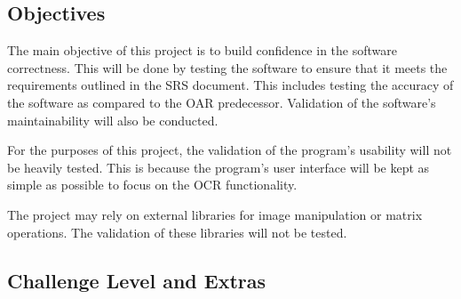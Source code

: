 \documentclass[12pt, titlepage]{article}
\begin{document}

\subsection{Objectives}

The main objective of this project is to build confidence in the software
correctness. This will be done by testing the software to ensure that it meets
the requirements outlined in the SRS document. This includes testing the accuracy
of the software as compared to the OAR predecessor. Validation of the software's
maintainability will also be conducted.

For the purposes of this project, the validation of the program's usability
will not be heavily tested. This is because the program's user interface will be
kept as simple as possible to focus on the OCR functionality.

The project may rely on external libraries for image manipulation or matrix
operations. The validation of these libraries will not be tested.




\subsection{Challenge Level and Extras}
\end{document}

